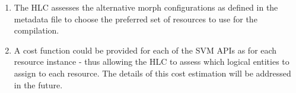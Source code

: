 \begin{enumerate}
\item The HLC assesses the alternative morph configurations as defined
in the metadata file to choose the preferred set of resources to use
for the compilation.

\item A cost function could be provided for each of the SVM APIs as
for each resource instance - thus allowing the HLC to assess which
logical entities to assign to each resource.  The details of this cost
estimation will be addressed in the future.

\end{enumerate}

